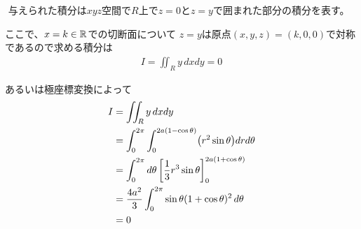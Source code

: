 \begin{ans*}
  ${}$
  与えられた積分は$xyz$空間で$R$上で$z=0$と$z=y$で囲まれた部分の積分を表す。

  ここで、$x = k\in\mathbb{R}$での切断面について
  $z=y$は原点$(x,y,z)=(k,0,0)$で対称であるので求める積分は
  \begin{gather}
    I = \iint_{R}y\,dxdy = 0
  \end{gather}
\end{ans*}
\begin{other*}
  あるいは極座標変換によって
  \begin{align}
    I
    &= \iint_{R}y\,dxdy \\
    &= \int_{0}^{2\pi}\int_{0}^{2a(1-\cos{\theta})}\bigl(r^2 \sin{\theta}\bigr)drd{\theta} \\
    &= \int_{0}^{2\pi}d{\theta} \left[\frac{1}{3}r^3 \sin{\theta}\right]_{0}^{2a(1+\cos{\theta})} \\
    &= \frac{4a^2}{3}\int_{0}^{2\pi} \sin{\theta}(1+\cos{\theta})^2\,d{\theta} \\
    &= 0
  \end{align}
\end{other*}

\newpage
